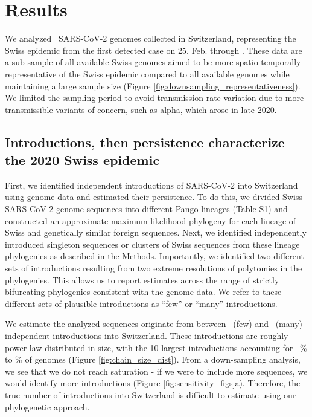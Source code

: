 \documentclass[11pt,twoside,lineno]{pnas-new} %
\begin{document}
\section{Results}
We analyzed \nfocalsamples\ SARS-CoV-2 genomes collected in Switzerland, representing the Swiss epidemic from the first detected case on 25. Feb. through \maxdate. These data are a sub-sample of all available Swiss genomes aimed to be more spatio-temporally representative of the Swiss epidemic compared to all available genomes while maintaining a large sample size (Figure  \ref{fig:downsampling_representativeness}). We limited the sampling period to avoid transmission rate variation due to more transmissible variants of concern, such as alpha, which arose in late 2020.

\subsection{Introductions, then persistence characterize the 2020 Swiss epidemic}

First, we identified independent introductions of SARS-CoV-2 into Switzerland using genome data and estimated their persistence. To do this, we divided Swiss SARS-CoV-2 genome sequences into different Pango lineages (Table S1) and constructed an approximate maximum-likelihood phylogeny for each lineage of Swiss and genetically similar foreign sequences. Next, we identified independently introduced singleton sequences or clusters of Swiss sequences from these lineage phylogenies as described in the Methods. Importantly, we identified two different sets of introductions resulting from two extreme resolutions of polytomies in the phylogenies. This allows us to report estimates across the range of strictly bifurcating phylogenies consistent with the genome data. We refer to these different sets of plausible introductions as ``few'' or ``many'' introductions.

We estimate the analyzed sequences originate from between \nchainsmin\ (few) and \nchainsmax\ (many) independent introductions into Switzerland. These introductions are roughly power law-distributed in size, with the 10 largest introductions accounting for \maxlargestchainsper\ \% to \minlargestchainsper \% of genomes (Figure \ref{fig:chain_size_dist}). From a down-sampling analysis, we see that we do not reach saturation - if we were to include more sequences, we would identify more introductions (Figure \ref{fig:sensitivity_figs}a). Therefore, the true number of introductions into Switzerland is difficult to estimate using our phylogenetic approach. 
\end{document}
